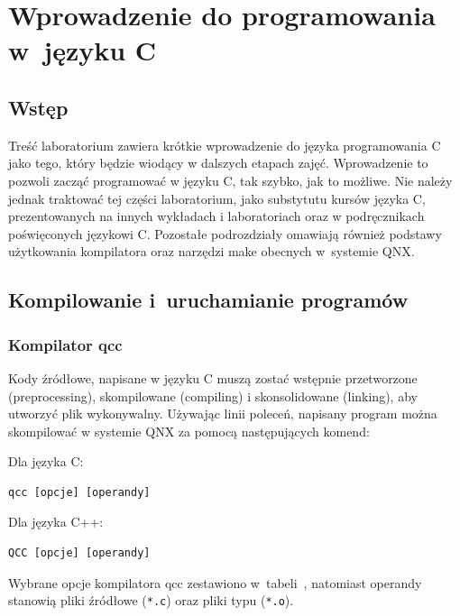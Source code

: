 \section{Wprowadzenie do programowania w~języku C}

\subsection{Wstęp}
Treść laboratorium zawiera krótkie wprowadzenie do języka programowania C jako tego, który będzie wiodący w dalszych etapach zajęć. Wprowadzenie to pozwoli zacząć programować w języku C, tak szybko, jak to możliwe. Nie należy jednak traktować tej części laboratorium, jako substytutu kursów języka C, prezentowanych na innych wykładach i laboratoriach oraz w podręcznikach poświęconych językowi C. Pozostałe podrozdziały omawiają również podstawy użytkowania kompilatora oraz narzędzi make obecnych w~systemie QNX.

\subsection{Kompilowanie i~uruchamianie programów}

\subsubsection{Kompilator qcc}

Kody źródłowe, napisane w języku C muszą zostać wstępnie przetworzone (preprocessing), skompilowane (compiling) i skonsolidowane (linking), aby utworzyć plik wykonywalny. Używając linii poleceń, napisany program można skompilować w systemie QNX za pomocą następujących komend:


Dla języka C:

\begin{lstlisting}[style=MyBashStyle]
qcc [opcje] [operandy]
\end{lstlisting}

Dla języka C++:

\begin{lstlisting}[style=MyBashStyle]
QCC [opcje] [operandy]
\end{lstlisting}

Wybrane opcje kompilatora qcc zestawiono w~tabeli~, natomiast operandy stanowią pliki źródłowe (\lstinline[style=MyBashStyle]{*.c}) oraz pliki typu (\lstinline[style=MyBashStyle]{*.o}).

